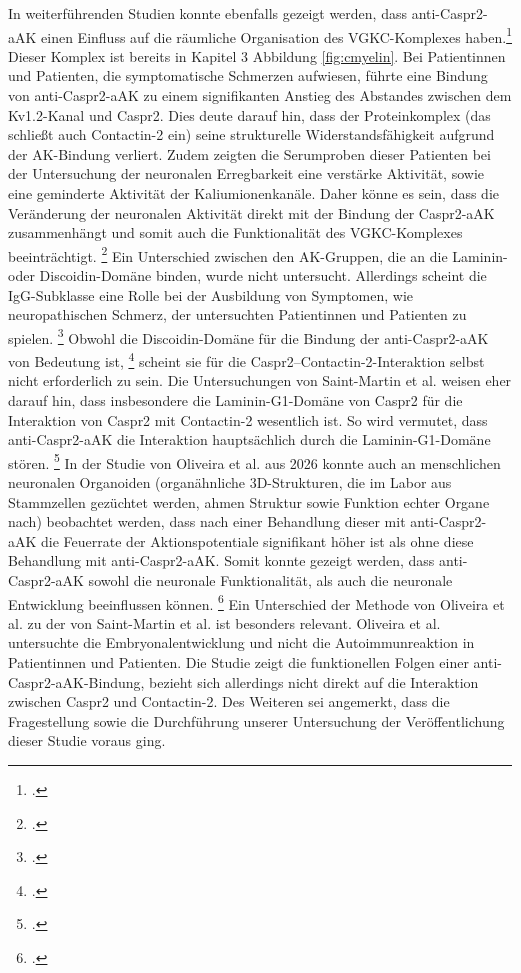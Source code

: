 In weiterführenden Studien konnte ebenfalls gezeigt werden, dass anti-Caspr2-aAK einen Einfluss auf die räumliche Organisation des VGKC-Komplexes haben.\footcite[S.~10]{Habib2025} Dieser Komplex ist bereits in Kapitel 3 Abbildung \ref{fig:cmyelin}. Bei Patientinnen und Patienten, die symptomatische Schmerzen aufwiesen, führte eine Bindung von anti-Caspr2-aAK zu einem signifikanten Anstieg des Abstandes zwischen dem Kv1.2-Kanal und Caspr2. Dies deute darauf hin, dass der Proteinkomplex (das schließt auch Contactin-2 ein) seine strukturelle Widerstandsfähigkeit aufgrund der AK-Bindung verliert. Zudem zeigten die Serumproben dieser Patienten bei der Untersuchung der neuronalen Erregbarkeit eine verstärke Aktivität, sowie eine geminderte Aktivität der Kaliumionenkanäle. Daher könne es sein, dass die Veränderung der neuronalen Aktivität direkt mit der Bindung der Caspr2-aAK zusammenhängt und somit auch die Funktionalität des VGKC-Komplexes beeinträchtigt. \footcite[S.~10]{Habib2025} Ein Unterschied zwischen den AK-Gruppen, die an die Laminin- oder Discoidin-Domäne binden, wurde nicht untersucht. Allerdings scheint die IgG-Subklasse eine Rolle bei der Ausbildung von Symptomen, wie neuropathischen Schmerz, der untersuchten Patientinnen und Patienten zu spielen. \footcite[S.~10 f]{Habib2025} Obwohl die Discoidin-Domäne für die Bindung der anti-Caspr2-aAK von Bedeutung ist, \footcite[S.~11]{VanHoof2024} scheint sie für die Caspr2–Contactin-2-Interaktion selbst nicht erforderlich zu sein. Die Untersuchungen von Saint-Martin et al. weisen eher darauf hin, dass insbesondere die Laminin-G1-Domäne von Caspr2 für die Interaktion von Caspr2 mit Contactin-2 wesentlich ist. So wird vermutet, dass anti-Caspr2-aAK die Interaktion hauptsächlich durch die Laminin-G1-Domäne stören. \footcite[S.~9]{SaintMartin2019} 
In der Studie von Oliveira et al. aus 2026 konnte auch an menschlichen neuronalen Organoiden (organähnliche 3D-Strukturen, die im Labor aus Stammzellen gezüchtet werden, ahmen Struktur sowie Funktion echter Organe nach) beobachtet werden, dass nach einer Behandlung dieser mit anti-Caspr2-aAK die Feuerrate der Aktionspotentiale signifikant höher ist als ohne diese Behandlung mit anti-Caspr2-aAK. Somit konnte gezeigt werden, dass anti-Caspr2-aAK sowohl die neuronale Funktionalität, als auch die neuronale Entwicklung beeinflussen können. \footcite[S.~8 f]{Oliveira2026} Ein Unterschied der Methode von Oliveira et al. zu der  von Saint-Martin et al. ist besonders relevant. Oliveira et al. untersuchte die Embryonalentwicklung und nicht die Autoimmunreaktion in Patientinnen und Patienten. Die Studie zeigt die funktionellen Folgen einer anti-Caspr2-aAK-Bindung, bezieht sich allerdings nicht direkt auf die Interaktion zwischen Caspr2 und Contactin-2. 
Des Weiteren sei angemerkt, dass die Fragestellung sowie die Durchführung unserer Untersuchung der Veröffentlichung dieser Studie voraus ging.


